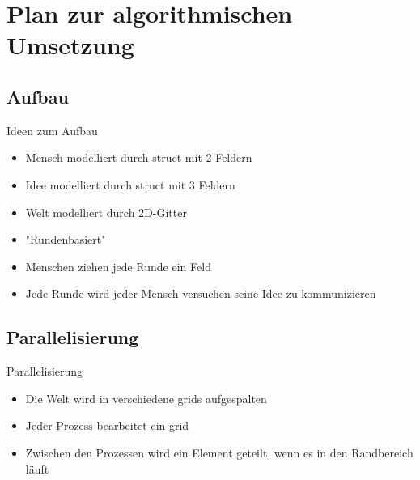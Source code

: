 \section{Plan zur algorithmischen Umsetzung}
\subsection{Aufbau}
\begin{frame}{Ideen zum Aufbau}
	\begin{itemize}[<+->]
		\item Mensch modelliert durch struct mit 2 Feldern
		\item Idee modelliert durch struct mit 3 Feldern
		\item Welt modelliert durch 2D-Gitter
		\item "Rundenbasiert"
		\item Menschen ziehen jede Runde ein Feld
		\item Jede Runde wird jeder Mensch versuchen seine Idee zu kommunizieren
	\end{itemize}		
\end{frame}

\subsection{Parallelisierung}
\begin{frame}{Parallelisierung}
	\begin{itemize}[<+->]
		\item Die Welt wird in verschiedene grids aufgespalten
		\item Jeder Prozess bearbeitet ein grid
		\item Zwischen den Prozessen wird ein Element geteilt, wenn es in den Randbereich läuft
	\end{itemize}
\end{frame}
